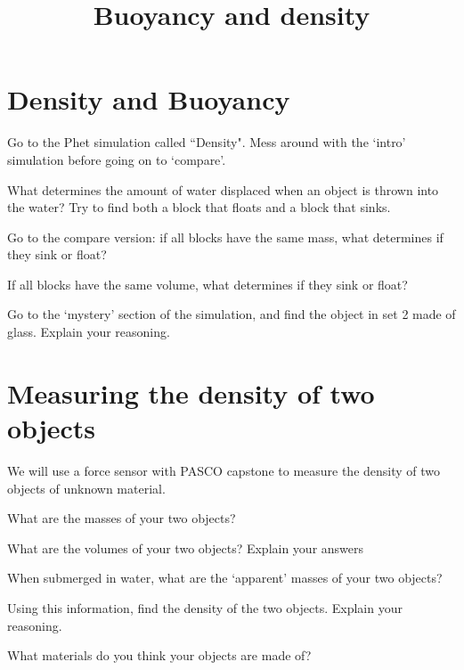 \documentclass{handout}
\title{Buoyancy and density}
\begin{document}
\maketitle

\section{Density and Buoyancy}
Go to the Phet simulation called ``Density". Mess around with the `intro' simulation before going on to `compare'.

\begin{questions}
\question What determines the amount of water displaced when an object is thrown into the water? Try to find both a block that floats and a block that sinks.

\answerspace{1.5in}

\question Go to the compare version: if all blocks have the same mass, what determines if they sink or float?

\answerspace{1.5in}

\question If all blocks have the same volume, what determines if they sink or float?

\answerspace{1.5in}

\question Go to the `mystery' section of the simulation, and find the object in set 2 made of glass. Explain your reasoning.
\end{questions}

\section{Measuring the density of two objects}
We will use a force sensor with PASCO capstone to measure the density of two objects of unknown material.
\begin{questions}
    \question What are the masses of your two objects?

    \answerspace{1.5in}

    \question What are the volumes of your two objects? Explain your answers

    \answerspace{\fill}
    \clearpage

    \question When submerged in water, what are the `apparent' masses of your two objects?

    \answerspace{1.5in}

    \question Using this information, find the density of the two objects. Explain  your reasoning.

    \answerspace{\fill}

    \question What materials do you think your objects are made of?

    \answerspace{2in}

\end{questions}
\end{document}
